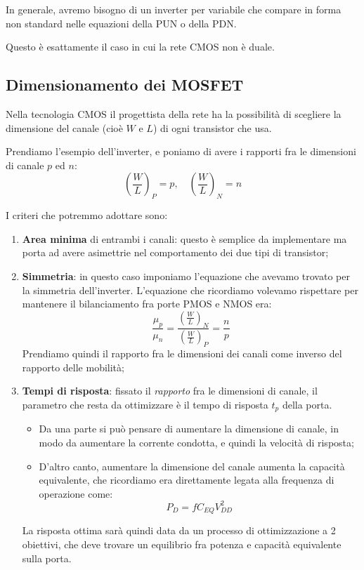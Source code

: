 \documentclass[a4paper,11pt]{article}
\begin{document}
In generale, avremo bisogno di un inverter per variabile che compare in forma non standard nelle equazioni della PUN o della PDN.

Questo è esattamente il caso in cui la rete CMOS non è duale.

\subsection{Dimensionamento dei MOSFET}
Nella tecnologia CMOS il progettista della rete ha la possibilità di scegliere la dimensione del canale (cioè $W$ e $L$) di ogni transistor che usa.

Prendiamo l'esempio dell'inverter, e poniamo di avere i rapporti fra le dimensioni di canale $p$ ed $n$:
$$
\left( \frac{W}{L} \right)_P = p, \quad \left( \frac{W}{L} \right)_N = n
$$

I criteri che potremmo adottare sono:
\begin{enumerate}
\item \textbf{Area minima} di entrambi i canali: questo è semplice da implementare ma porta ad avere asimettrie nel comportamento dei due tipi di transistor;
\item \textbf{Simmetria}: in questo caso imponiamo l'equazione che avevamo trovato per la simmetria dell'inverter. L'equazione che ricordiamo volevamo rispettare per mantenere il bilanciamento fra porte PMOS e NMOS era:
$$
\frac{\mu_p}{\mu_n} = \frac{ \left( \frac{W}{L} \right)_N }{ \left( \frac{W}{L} \right)_P } = \frac{n}{p}
$$
Prendiamo quindi il rapporto fra le dimensioni dei canali come inverso del rapporto delle mobilità;
\item \textbf{Tempi di risposta}: fissato il \textit{rapporto} fra le dimensioni di canale, il parametro che resta da ottimizzare è il tempo di risposta $t_p$ della porta.
	\begin{itemize}
		\item Da una parte si può pensare di aumentare la dimensione di canale, in modo da aumentare la corrente condotta, e quindi la velocità di risposta;
		\item D'altro canto, aumentare la dimensione del canale aumenta la capacità equivalente, che ricordiamo era direttamente legata alla frequenza di operazione come:
			$$
				P_D = f C_{EQ} V_{DD}^2
			$$
	\end{itemize}
	La risposta ottima sarà quindi data da un processo di ottimizzazione a 2 obiettivi, che deve trovare un equilibrio fra potenza e capacità equivalente sulla porta.
\end{enumerate}
\end{document}
